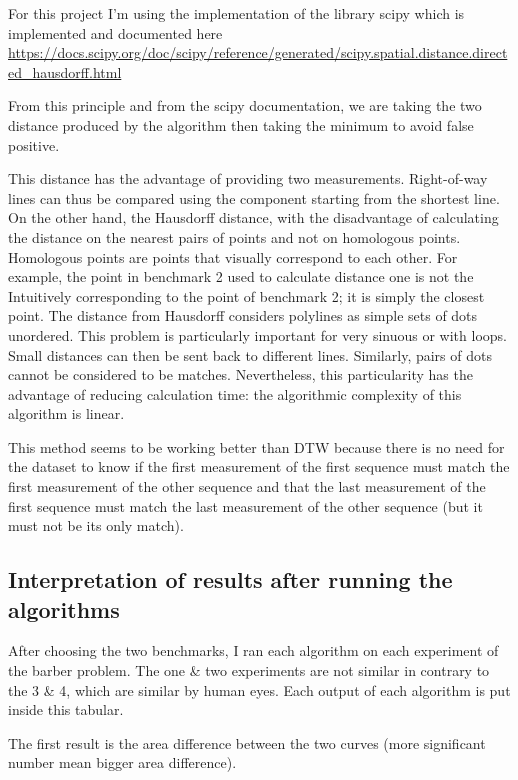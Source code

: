 \documentclass{article}
\begin{document}
For this project I'm using the implementation of the library scipy which is implemented and documented here \url{https://docs.scipy.org/doc/scipy/reference/generated/scipy.spatial.distance.directed_hausdorff.html}

From this principle and from the scipy documentation, we are taking the two distance produced by the algorithm then taking the minimum to avoid false positive.

This distance has the advantage of providing two measurements. Right-of-way lines can thus be compared using the component starting from the shortest line. On the other hand, the Hausdorff distance, with the disadvantage of calculating the
distance on the nearest pairs of points and not on homologous points. Homologous points are points that visually correspond to each other. For example, the point in benchmark 2 used to calculate distance one is not the Intuitively corresponding to the point of benchmark 2; it is simply the closest point. The distance from Hausdorff considers polylines as simple sets of dots unordered. This problem is particularly important for very sinuous or with loops. Small distances can then be sent back to different lines. Similarly, pairs of dots cannot be considered to be matches. Nevertheless, this particularity has the advantage of reducing calculation time: the algorithmic complexity of this algorithm is linear. 


This method seems to be working better than DTW because there is no need for the dataset to know if the first measurement of the first sequence must match the first measurement of the other sequence and that the last measurement of the first sequence must match the last measurement of the other sequence (but it must not be its only match).



\subsection{Interpretation of results after running the algorithms}

After choosing the two benchmarks, I ran each algorithm on each experiment of the barber problem.
The one \& two experiments are not similar in contrary to the 3 \& 4, which are similar by human eyes.
Each output of each algorithm is put inside this tabular.


The first result is the area difference between the two curves (more significant number mean bigger area difference).
\end{document}
